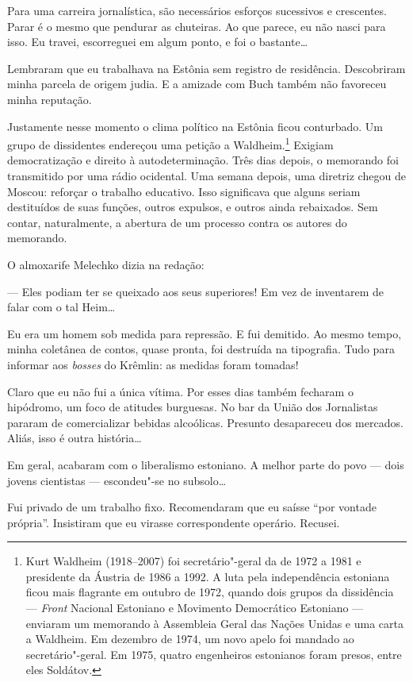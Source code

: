 Para uma carreira jornalística, são necessários esforços sucessivos e
crescentes. Parar é o mesmo que pendurar as chuteiras. Ao que parece, eu
não nasci para isso. Eu travei, escorreguei em algum ponto, e foi o
bastante\ldots{}

Lembraram que eu trabalhava na Estônia sem registro de residência.
Descobriram minha parcela de origem judia. E a amizade com Buch também
não favoreceu minha reputação.

Justamente nesse momento o clima político na Estônia ficou conturbado.
Um grupo de dissidentes endereçou uma petição a Waldheim.\footnote{Kurt
  Waldheim (1918--2007) foi secretário"-geral da  de 1972 a 1981 e
  presidente da Áustria de 1986 a 1992. A luta pela independência estoniana ficou mais flagrante em outubro de 1972, quando dois grupos da dissidência --- \emph{Front} Nacional Estoniano e Movimento Democrático Estoniano --- enviaram um memorando à Assembleia Geral das Nações Unidas e uma carta a Waldheim. Em dezembro de 1974, um novo apelo foi mandado ao secretário"-geral. Em 1975, quatro engenheiros estonianos foram presos, entre eles Soldátov.} Exigiam democratização e
direito à autodeterminação. Três dias depois, o memorando foi
transmitido por uma rádio ocidental. Uma semana depois, uma diretriz
chegou de Moscou: reforçar o trabalho educativo. Isso significava que
alguns seriam destituídos de suas funções, outros expulsos, e outros
ainda rebaixados. Sem contar, naturalmente, a abertura de um processo
contra os autores do memorando.

O almoxarife Melechko dizia na redação:

--- Eles podiam ter se queixado aos seus superiores! Em vez de
inventarem de falar com o tal Heim\ldots{}

Eu era um homem sob medida para repressão. E fui demitido. Ao mesmo
tempo, minha coletânea de contos, quase pronta, foi destruída na
tipografia. Tudo para informar aos \emph{bosses} do Krêmlin: as
medidas foram tomadas!

Claro que eu não fui a única vítima. Por esses dias também fecharam o
hipódromo, um foco de atitudes burguesas. No bar da União dos
Jornalistas pararam de comercializar bebidas alcoólicas. Presunto
desapareceu dos mercados. Aliás, isso é outra história\ldots{}

Em geral, acabaram com o liberalismo estoniano. A melhor parte do povo
--- dois jovens cientistas --- escondeu"-se no subsolo\ldots{}

Fui privado de um trabalho fixo. Recomendaram que eu saísse
``por vontade própria''. Insistiram que eu virasse correspondente operário.
Recusei.

